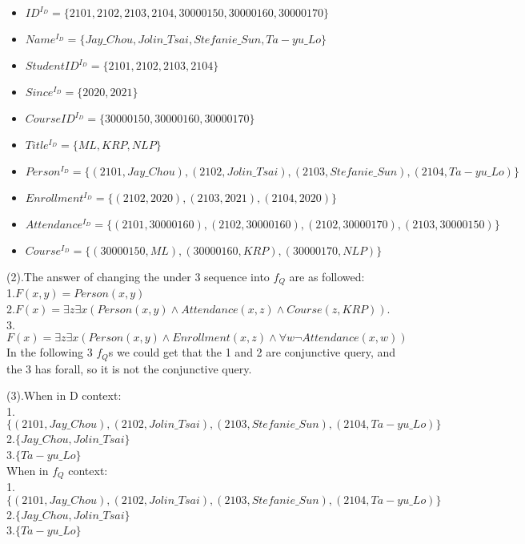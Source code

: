 \documentclass{article}
\begin{document}
    \begin{itemize}
        \item $ID^{I_D}=\{2101, 2102, 2103, 2104, 30000150, 30000160, 30000170\}$
        \item $Name^{I_D}=\{Jay\_Chou, Jolin\_Tsai, Stefanie\_Sun, Ta-yu\_Lo\}$
        \item $StudentID^{I_D}=\{2101, 2102, 2103, 2104\}$
        \item $Since^{I_D}=\{2020, 2021\}$
        \item $CourseID^{I_D}=\{30000150, 30000160, 30000170\}$
        \item $Title^{I_D}=\{ML, KRP, NLP\}$
        \item $Person^{I_D}=\{(2101,Jay\_Chou),(2102,Jolin\_Tsai),(2103,Stefanie\_Sun),(2104,Ta-yu\_Lo)\}$
        \item $Enrollment^{I_D}=\{(2102,2020),(2103,2021),(2104,2020)\}$
        \item $Attendance^{I_D}=\{(2101,30000160),(2102,30000160),(2102,30000170),(2103,30000150)\}$
        \item $Course^{I_D}=\{(30000150,ML),(30000160,KRP),(30000170,NLP)\}$
    \end{itemize}
    (2).The answer of changing the under 3 sequence into $f_Q$ are as followed:\\
    1.$F(x,y) = Person(x,y)$\\
    2.$F(x) = \exists z\exists x(Person(x,y)\wedge Attendance(x,z)\wedge Course(z,KRP))$.\\
    3.$F(x) = \exists z\exists x(Person(x,y)\wedge Enrollment(x,z)\wedge \forall w \neg Attendance(x,w))$ \\
    In the following 3 $f_Q$s we could get that the 1 and 2 are conjunctive query, and the 3 has forall, so it is not the conjunctive query.

    (3).When in D context:\\
    1.$\{(2101,Jay\_Chou),(2102,Jolin\_Tsai),(2103,Stefanie\_Sun),(2104,Ta-yu\_Lo)\}$\\
    2.$\{Jay\_Chou, Jolin\_Tsai\}$\\
    3.$\{Ta-yu\_Lo\}$\\
    When in $f_Q$ context:\\
    1.$\{(2101,Jay\_Chou),(2102,Jolin\_Tsai),(2103,Stefanie\_Sun),(2104,Ta-yu\_Lo)\}$\\
    2.$\{Jay\_Chou, Jolin\_Tsai\}$\\
    3.$\{Ta-yu\_Lo\}$\\
\end{document}
